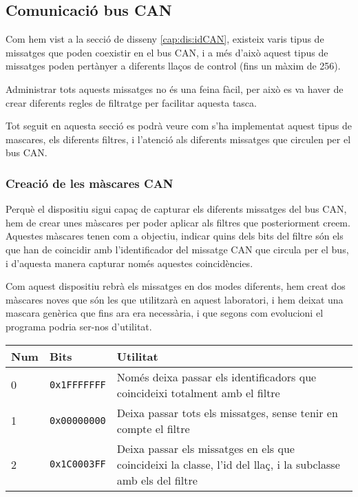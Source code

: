 \subsection{Comunicació bus CAN}\label{lab:imp:dspic:can}

Com hem vist a la secció de disseny \ref{cap:dis:idCAN}, existeix varis tipus de missatges que poden coexistir en el bus CAN, i a més d'això aquest tipus de missatges poden pertànyer a diferents llaços de control (fins un màxim de 256).

Administrar tots aquests missatges no és una feina fàcil, per això es va haver de crear diferents regles de filtratge per facilitar aquesta tasca.

Tot seguit en aquesta secció es podrà veure com s'ha implementat aquest tipus de mascares, els diferents filtres, i l'atenció als diferents missatges que circulen per el bus CAN.

\subsubsection{Creació de les màscares CAN}\label{lab:imp:dspic:monitor:can:masc}

Perquè el dispositiu \Monitor sigui capaç de capturar els diferents missatges del bus CAN, hem de crear unes màscares per poder aplicar als filtres que posteriorment creem. Aquestes màscares tenen com a objectiu, indicar quins dels bits del filtre són els que han de coincidir amb l'identificador del missatge CAN que circula per el bus, i d'aquesta manera capturar només aquestes coincidències.

Com aquest dispositiu rebrà els missatges en dos modes diferents, hem creat dos màscares noves que són les que utilitzarà en aquest laboratori, i hem deixat una mascara genèrica que fins ara era necessària, i que segons com evolucioni el programa podria ser-nos d'utilitat.

\begin{center}
	\begin{tabularx}{\linewidth}{l | l | X}
		\textbf{Num} & \textbf{Bits} & \textbf{Utilitat} \\
		\hline
		0 & \texttt{0x1FFFFFFF} & Només deixa passar els identificadors que coincideixi totalment amb el filtre \\
		\hline
		1 & \texttt{0x00000000} & Deixa passar tots els missatges, sense tenir en compte el filtre \\
		\hline
		2 & \texttt{0x1C0003FF} & Deixa passar els missatges en els que coincideixi la classe, l'id del llaç, i la subclasse amb els del filtre\\
		\hline
	\end{tabularx}
	\label{tab:imp:dspic:monitor:mascares}
\end{center}

